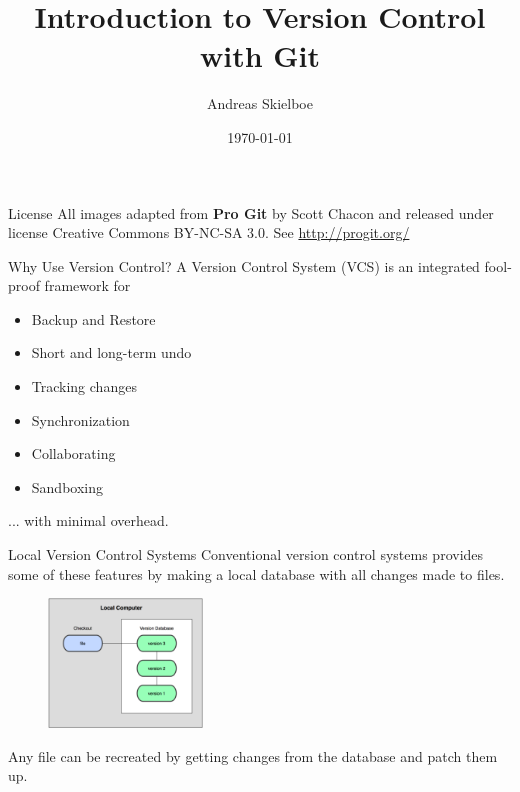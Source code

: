 \documentclass{beamer}
\title[Git - Version Control System]{Introduction  to Version Control with Git}
\author{Andreas Skielboe}
\institute{Dark Cosmology Centre \\ Niels Bohr Institute}
\date{\today}
\def \figureHeight {130px}
\begin{document}
\begin{frame}
	\titlepage
\end{frame}

\begin{frame}{License}
	All images adapted from {\bf Pro Git} by Scott Chacon and released under license Creative Commons BY-NC-SA 3.0.
	\vskip15pt
	See \url{http://progit.org/}
\end{frame}

\begin{frame}{Why Use Version Control?}
	A Version Control System (VCS) is an integrated fool-proof framework for
	\begin{itemize}
		\item Backup and Restore
		\item Short and long-term undo
		\item Tracking changes
		\item Synchronization
		\item Collaborating
		\item Sandboxing
	\end{itemize}
	... with minimal overhead.
\end{frame}

\begin{frame}{Local Version Control Systems}
	Conventional version control systems provides some of these features by making a local database with all changes made to files.
	\begin{figure}
		\includegraphics[height=\figureHeight]{images/local-version-control.png}
	\end{figure}
	Any file can be recreated by getting changes from the database and patch them up.
\end{frame}
\end{document}
